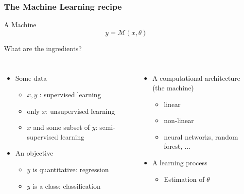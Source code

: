\documentclass[handout, 10pt]{beamer}
\begin{document}
\begin{frame}
\frametitle{The Machine Learning recipe}
\begin{block}{A Machine}
\begin{equation*}
y = \mathcal{M}(x,\theta)
\end{equation*}
\end{block}
What are \alert{the ingredients}? 
\begin{columns}[t]


\begin{itemize}
    \item<2-> Some \alert{data}
    \begin{itemize}
        \item $x,y$ : supervised learning
        \item only $x$: unsupervised learning
        \item $x$ and some subset of $y$: semi-supervised learning
    \end{itemize}
    
    
    \item<3-> An \alert{objective}
        \begin{itemize}
\item $y$ is quantitative: regression
\item $y$ is a class: classification
    \end{itemize}
    \end{itemize}
    

\begin{itemize}
    \item<4-> A computational architecture (the \alert{machine})
        \begin{itemize}
        \item linear
        \item non-linear
        \item neural networks, random forest, ...
    \end{itemize}
    \item<5-> A \alert{learning} process
    \begin{itemize}
        \item Estimation of $\theta$
    \end{itemize}
\end{itemize}

\end{columns}

\end{frame}
\end{document}
